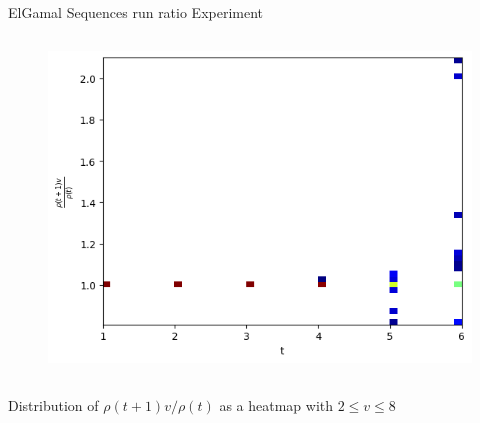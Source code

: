 \begin{frame}{ElGamal Sequences run ratio Experiment}
\begin{columns}
\begin{column}{0.45\textwidth}
\begin{figure}
                \includegraphics[width=\textwidth]{figures/AllDataAndvisGenNormalizedrunratio.png}
            \end{figure}
        \end{column}
    \end{columns}
    \begin{center}
                Distribution of $\rho(t+1)v/\rho(t)$ as a heatmap with $2 \leq v \leq 8$
    \end{center}
\end{frame}

